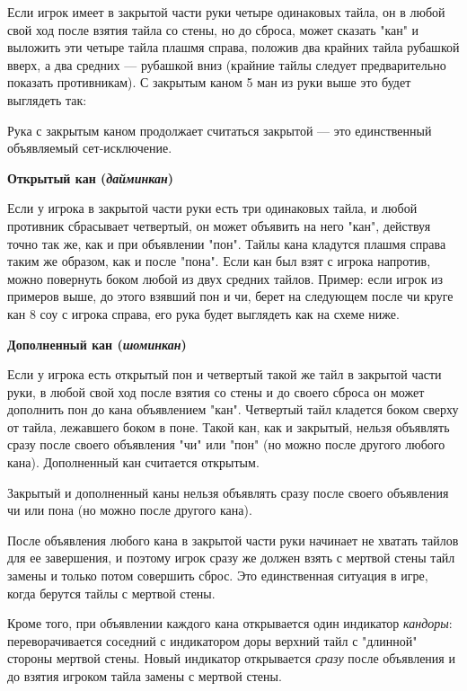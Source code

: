 Если игрок имеет в закрытой части руки четыре одинаковых тайла, он в любой свой ход после взятия тайла со стены, но до сброса, может сказать "кан" и выложить эти четыре тайла плашмя справа, положив два крайних тайла рубашкой вверх, а два средних --- рубашкой вниз (крайние тайлы следует предварительно показать противникам). С закрытым каном 5 ман из руки выше это будет выглядеть так:

 \hfill {}

Рука с закрытым каном продолжает считаться закрытой --- это единственный объявляемый сет-исключение.

\textbf{Открытый кан (\textit{дайминкан})}

Если у игрока в закрытой части руки есть три одинаковых тайла, и любой противник сбрасывает четвертый, он может объявить на него "кан", действуя точно так же, как и при объявлении "пон". Тайлы кана кладутся плашмя справа таким же образом, как и после "пона". Если кан был взят с игрока напротив, можно повернуть боком любой из двух средних тайлов. Пример: если игрок из примеров выше, до этого взявший пон и чи, берет на следующем после чи круге кан 8 соу с игрока справа, его рука будет выглядеть как на схеме ниже.

 \hfill {}

\textbf{Дополненный кан (\textit{шоминкан})}

Если у игрока есть открытый пон и четвертый такой же тайл в закрытой части руки, в любой свой ход после взятия со стены и до своего сброса он может дополнить пон до кана объявлением "кан". Четвертый тайл кладется боком сверху от тайла, лежавшего боком в поне. Такой кан, как и закрытый, нельзя объявлять сразу после своего объявления "чи" или "пон" (но можно после другого любого кана). Дополненный кан считается открытым.

 \hfill {}

Закрытый и дополненный каны нельзя объявлять сразу после своего объявления чи или пона (но можно после другого кана). 

После объявления любого кана в закрытой части руки начинает не хватать тайлов для ее завершения, и поэтому игрок сразу же должен взять с мертвой стены тайл замены и только потом совершить сброс. Это единственная ситуация в игре, когда берутся тайлы с мертвой стены. 

Кроме того, при объявлении каждого кана открывается один индикатор \textit{кандоры}: переворачивается соседний с индикатором доры верхний тайл с "длинной" стороны мертвой стены. Новый индикатор открывается \textit{сразу} после объявления и до взятия игроком тайла замены с мертвой стены.


